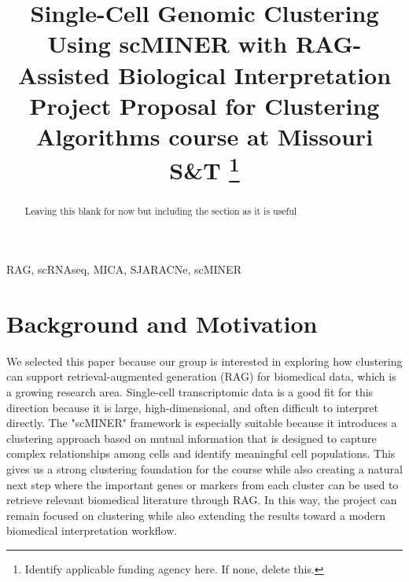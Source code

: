 \documentclass[conference]{IEEEtran}
\begin{document}
\title{Single-Cell Genomic Clustering Using scMINER with RAG-Assisted Biological Interpretation\\
{\footnotesize{Project Proposal for Clustering Algorithms course at Missouri S\&T}}
\thanks{Identify applicable funding agency here. If none, delete this.}
}

\author{
\and
{}
\and
{}
}

\maketitle

\begin{abstract}
Leaving this blank for now but including the section as it is useful
\end{abstract}

\begin{IEEEkeywords}
RAG, scRNAseq, MICA, SJARACNe, scMINER
\end{IEEEkeywords}

\section{Background and Motivation}
We selected this paper because our group is interested in exploring how clustering can support retrieval-augmented generation (RAG) for biomedical data, which is a growing research area. Single-cell transcriptomic data is a good fit for this direction because it is large, high-dimensional, and often difficult to interpret directly. The "scMINER" framework is especially suitable because it introduces a clustering approach based on mutual information that is designed to capture complex relationships among cells and identify meaningful cell populations. This gives us a strong clustering foundation for the course while also creating a natural next step where the important genes or markers from each cluster can be used to retrieve relevant biomedical literature through RAG. In this way, the project can remain focused on clustering while also extending the results toward a modern biomedical interpretation workflow. 
\end{document}
